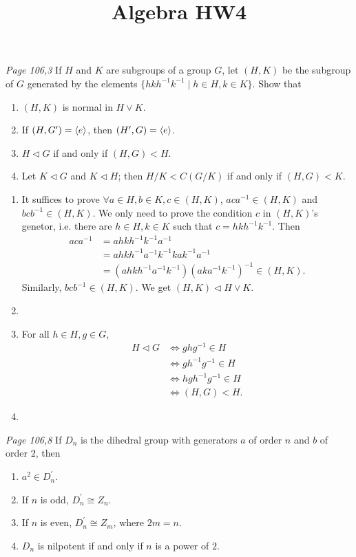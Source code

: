 

\title{Algebra HW4}
\author{\asemail}
\maketitle

\begin{enumerate}
	\isep[1em]

\prob
\textit{Page 106,3}%
If $H$ and $K$ are subgroups of a group $G$, let $(H,K)$ be the subgroup of $G$ generated by the elements $\{hkh^{-1}k^{-1}\mid h\in H, k \in K\}$. Show that
\begin{enumerate}
	\item $(H,K)$ is normal in $H\vee K$.
	\item If $(H,G^\prime)=\langle e\rangle$, then $(H^\prime, G)=\langle e\rangle$.
	\item $H\lhd G$ if and only if $(H,G)<H$.
	\item Let $K\lhd G$ and $K\lhd H$; then $H/K<C(G/K)$ if and only if $(H,G)<K$.
\end{enumerate}
\soln
\begin{enumerate}
	\item It suffices to prove $\forall a\in H, b\in K, c\in (H,K)$, $aca^{-1}\in (H,K)$ and $bcb^{-1}\in (H,K)$.
	We only need to prove the condition $c$ in $(H,K)$'s genetor, i.e. there are $h\in H, k\in K$ such that $c=hkh^{-1}k^{-1}$. Then 
	\begin{align*}
		aca^{-1} &= ahkh^{-1}k^{-1}a^{-1}
\\ &= ahkh^{-1}a^{-1}k^{-1}kak^{-1}a^{-1}
\\ &= (ahkh^{-1}a^{-1}k^{-1})(aka^{-1}k^{-1})^{-1} \in (H,K).
	\end{align*}
Similarly, $bcb^{-1}\in (H,K)$. We get $(H,K) \lhd H\vee K$.
	\item \vspace{2cm}
	\item For all $h\in H, g\in G$,
\begin{align*}
	H\lhd G &\Leftrightarrow ghg^{-1} \in H
\\ &\Leftrightarrow gh^{-1}g^{-1} \in H
\\ &\Leftrightarrow hgh^{-1}g^{-1} \in H
\\ &\Leftrightarrow (H,G)<H.
\end{align*}
	\item 
\end{enumerate}

\newpage
\prob \textit{Page 106,8}
If $D_n$ is the dihedral group with generators $a$ of order $n$ and $b$ of order $2$, then
\begin{enumerate}
	\item $a^2\in D_n^\prime$.
	\item If $n$ is odd, $D_n^\prime\cong Z_n$.
	\item If $n$ is even, $D_n^\prime\cong Z_m$, where $2m=n$.
	\item $D_n$ is nilpotent if and only if $n$ is a power of $2$.
\end{enumerate}
\soln


\end{enumerate}
